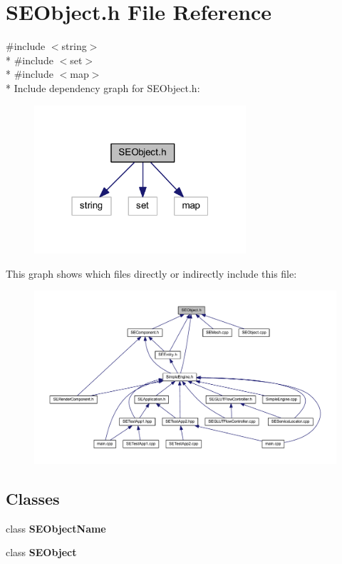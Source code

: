 \section{S\+E\+Object.\+h File Reference}
\label{_s_e_object_8h}
{\ttfamily \#include $<$string$>$}\\*
{\ttfamily \#include $<$set$>$}\\*
{\ttfamily \#include $<$map$>$}\\*
Include dependency graph for S\+E\+Object.\+h\+:
\nopagebreak
\begin{figure}[H]
\begin{center}
\leavevmode
\includegraphics[width=223pt]{_s_e_object_8h__incl}
\end{center}
\end{figure}
This graph shows which files directly or indirectly include this file\+:
\nopagebreak
\begin{figure}[H]
\begin{center}
\leavevmode
\includegraphics[width=350pt]{_s_e_object_8h__dep__incl}
\end{center}
\end{figure}
\subsection*{Classes}
\begin{DoxyCompactItemize}
\item 
class {\bf S\+E\+Object\+Name}
\item 
class {\bf S\+E\+Object}
\end{DoxyCompactItemize}
